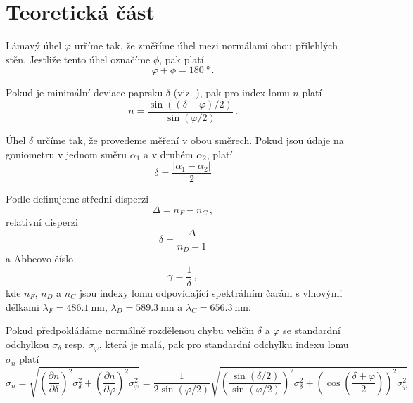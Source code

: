 \section*{Teoretická část}
Lámavý úhel $\varphi$ urříme tak, že změříme úhel mezi normálami obou přilehlých stěn. Jestliže tento úhel označíme $\phi$, pak platí
\begin{equation} \label{e:vrchol}
\varphi + \phi = \SI{180}{\degree} \,.
\end{equation}

Pokud je minimální deviace paprsku $\delta$ (viz. \cite{skripta}), pak pro index lomu $n$ platí
\begin{equation} \label{e:indexlomu}
n=\frac{\sin((\delta+\varphi)/2)}{\sin(\varphi/2)} \,.
\end{equation}

Úhel $\delta$ určíme tak, že provedeme měření v obou směrech. Pokud jsou údaje na goniometru v jednom směru $\alpha_1$ a v druhém $\alpha_2$, platí
\begin{equation*}
\delta = \frac{\left|\alpha_1-\alpha_2\right|}{2}
\end{equation*}

Podle \cite{skripta} definujeme střední disperzi
\begin{equation}
\Delta = n_F - n_C \,,
\end{equation}
relativní disperzi
\begin{equation}
\delta = \frac{\Delta}{n_D-1}
\end{equation}
a Abbeovo číslo
\begin{equation}
\gamma = \frac{1}{\delta} \,,
\end{equation}
kde $n_F$, $n_D$ a $n_C$ jsou indexy lomu odpovídající spektrálním čarám s vlnovými délkami $\lambda_F=\SI{486.1}{\nm}$, $\lambda_D=\SI{589.3}{\nm}$ a $\lambda_C=\SI{656.3}{\nm}$.

Pokud předpokládáme normálně rozdělenou chybu veličin $\delta$ a $\varphi$ se standardní odchylkou $\sigma_\delta$ resp. $\sigma_\varphi$, která je malá, pak pro standardní odchylku indexu lomu $\sigma_n$ platí
\begin{equation} \label{e:chyba}
\sigma_n = \sqrt{\left( \frac{\partial n}{\partial \delta} \right)^2 \sigma_\delta^2 + \left( \frac{\partial n}{\partial \varphi }\right)^2 \sigma_\varphi^2} = \frac{1}{2\sin(\varphi/2)}\sqrt{  \left( \frac{\sin(\delta/2)}{\sin(\varphi/2)} \right)^2  \sigma_\delta^2      +         \left( \cos\left(\frac{\delta+\varphi}{2}\right) \right)^2 \sigma_\varphi^2         }
\end{equation} 